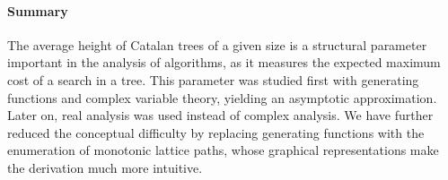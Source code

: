 
\paragraph{Summary}

The average height of Catalan trees of a given size is a structural
parameter important in the analysis of algorithms, as it measures the
expected maximum cost of a search in a tree. This parameter was
studied first with generating functions and complex variable theory,
yielding an asymptotic approximation. Later on, real analysis was used
instead of complex analysis. We have further reduced the conceptual
difficulty by replacing generating functions with the enumeration of
monotonic lattice paths, whose graphical representations make the
derivation much more intuitive.

